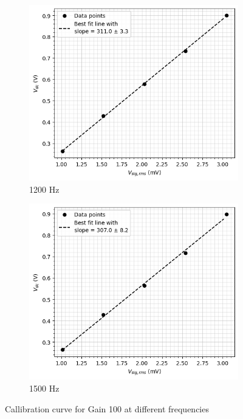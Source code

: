     \begin{figure}[H]
    \ContinuedFloat
    \begin{subfigure}{\linewidth}
    \includegraphics[width=1\textwidth]{images/b4.png}
    \caption{1200 Hz}
    \end{subfigure}
    
    \bigskip
    \begin{subfigure}{\linewidth}
    \includegraphics[width=1\textwidth]{images/b5.png}
    \caption{1500 Hz}
    \end{subfigure}
    
    \caption{Callibration curve for Gain 100 at different frequencies}
    \label{g2}
\end{figure}


